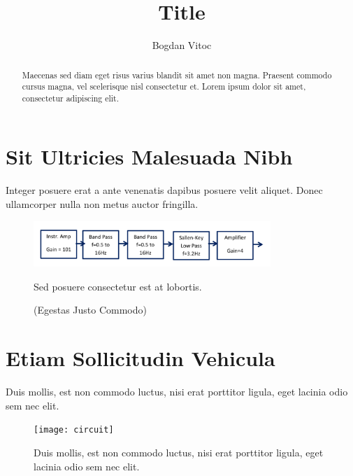 \documentclass[11pt]{article}
\begin{document}
\title{Title}
\author{Bogdan Vitoc}
\maketitle



\begin{abstract}
    Maecenas sed diam eget risus varius blandit sit amet non magna. Praesent commodo cursus magna, vel scelerisque nisl consectetur et. Lorem ipsum dolor sit amet, consectetur adipiscing elit.
\end{abstract}


\section{Sit Ultricies Malesuada Nibh}

Integer posuere erat a ante venenatis dapibus posuere velit aliquet. Donec ullamcorper nulla non metus auctor fringilla.

\begin{figure} [H] %
	\centering

	\includegraphics[width=0.8\textwidth]{block_diagram}

	\caption{Sed posuere consectetur est at lobortis.}
	\caption*{\small (Egestas Justo Commodo)}
\end{figure}


\section{Etiam Sollicitudin Vehicula}

Duis mollis, est non commodo luctus, nisi erat porttitor ligula, eget lacinia odio sem nec elit.

\begin{figure} [H]
	\centering

	\texttt{[image: circuit]}

	\caption{Duis mollis, est non commodo luctus, nisi erat porttitor ligula, eget lacinia odio sem nec elit.}
\end{figure}
\end{document}
